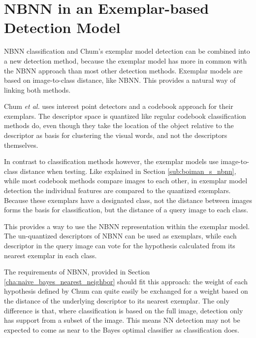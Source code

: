 
\section{NBNN in an Exemplar-based Detection Model} %
\label{cha:linking}

NBNN classification and Chum's exemplar model detection \cite{chum2007exemplar} can be combined into a new detection method, because the exemplar model has more in common with the NBNN approach than most other detection methods. Exemplar models are based on image-to-class distance, like NBNN. This provides a natural way of linking both methods.

Chum \emph{et al.}\cite{chum2007exemplar} uses interest point detectors and a codebook approach for their exemplars. The descriptor space is quantized like regular codebook classification methods do, even though they take the location of the object relative to the descriptor as basis for clustering the visual words, and not the descriptors themselves.

In contrast to classification methods however, the exemplar models use image-to-class distance when testing. Like explained in Section \ref{sub:boiman_s_nbnn}, while most codebook methods  compare images to each other, in exemplar model detection the individual features are compared to the quantized exemplars. Because these exemplars have a designated class, not the distance between images forms the basis for classification, but the distance of a query image to each class.

 This provides a way to use the NBNN representation within the exemplar model. The un-quantized descriptors of NBNN can be used as exemplars, while each descriptor in the query image can vote for the hypothesis calculated from its nearest exemplar in each class. 

The requirements of NBNN, provided in Section \ref{cha:naive_bayes_nearest_neighbor} should fit this approach: the weight of each hypothesis defined by Chum can quite easily be exchanged for a weight based on the distance of the underlying descriptor to its nearest exemplar. The only difference is that, where classification is based on the full image, detection only has support from a subset of the image. This means NN detection may not be expected to come as near to the Bayes optimal classifier as classification does.

